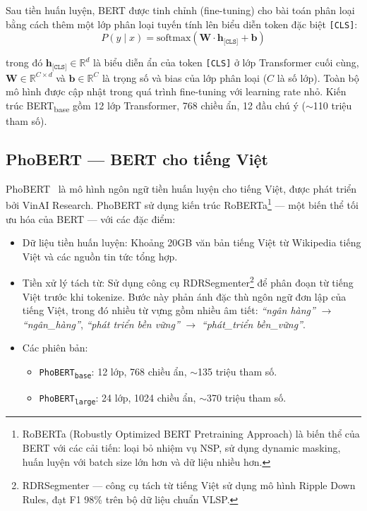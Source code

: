 Sau tiền huấn luyện, BERT được tinh chỉnh (fine-tuning) cho bài toán phân loại bằng cách thêm một lớp phân loại tuyến tính lên biểu diễn token đặc biệt \texttt{[CLS]}:
\begin{equation}
    P(y \mid x) = \text{softmax}(\mathbf{W} \cdot \mathbf{h}_{\texttt{[CLS]}} + \mathbf{b})
    \label{eq:bert_cls}
\end{equation}

\noindent trong đó $\mathbf{h}_{\texttt{[CLS]}} \in \mathbb{R}^d$ là biểu diễn ẩn của token \texttt{[CLS]} ở lớp Transformer cuối cùng, $\mathbf{W} \in \mathbb{R}^{C \times d}$ và $\mathbf{b} \in \mathbb{R}^C$ là trọng số và bias của lớp phân loại ($C$ là số lớp). Toàn bộ mô hình được cập nhật trong quá trình fine-tuning với learning rate nhỏ. Kiến trúc BERT\textsubscript{base} gồm 12 lớp Transformer, 768 chiều ẩn, 12 đầu chú ý ($\sim$110 triệu tham số).


\subsection{PhoBERT --- BERT cho tiếng Việt}
\label{subsec:phobert}

PhoBERT~\cite{nguyen2020phobert} là mô hình ngôn ngữ tiền huấn luyện cho tiếng Việt, được phát triển bởi VinAI Research. PhoBERT sử dụng kiến trúc RoBERTa\footnote{RoBERTa (Robustly Optimized BERT Pretraining Approach) là biến thể của BERT với các cải tiến: loại bỏ nhiệm vụ NSP, sử dụng dynamic masking, huấn luyện với batch size lớn hơn và dữ liệu nhiều hơn.} --- một biến thể tối ưu hóa của BERT --- với các đặc điểm:

\begin{itemize}
    \item Dữ liệu tiền huấn luyện: Khoảng 20GB văn bản tiếng Việt từ Wikipedia tiếng Việt và các nguồn tin tức tổng hợp.
    \item Tiền xử lý tách từ: Sử dụng công cụ RDRSegmenter\footnote{RDRSegmenter --- công cụ tách từ tiếng Việt sử dụng mô hình Ripple Down Rules, đạt F1 98\% trên bộ dữ liệu chuẩn VLSP.} để phân đoạn từ tiếng Việt trước khi tokenize. Bước này phản ánh đặc thù ngôn ngữ đơn lập của tiếng Việt, trong đó nhiều từ vựng gồm nhiều âm tiết: \textit{``ngân hàng''} $\rightarrow$ \textit{``ngân\_hàng''}, \textit{``phát triển bền vững''} $\rightarrow$ \textit{``phát\_triển bền\_vững''}.
    \item Các phiên bản:
    \begin{itemize}
        \item \texttt{PhoBERT\textsubscript{base}}: 12 lớp, 768 chiều ẩn, $\sim$135 triệu tham số.
        \item \texttt{PhoBERT\textsubscript{large}}: 24 lớp, 1024 chiều ẩn, $\sim$370 triệu tham số.
    \end{itemize}
\end{itemize}


